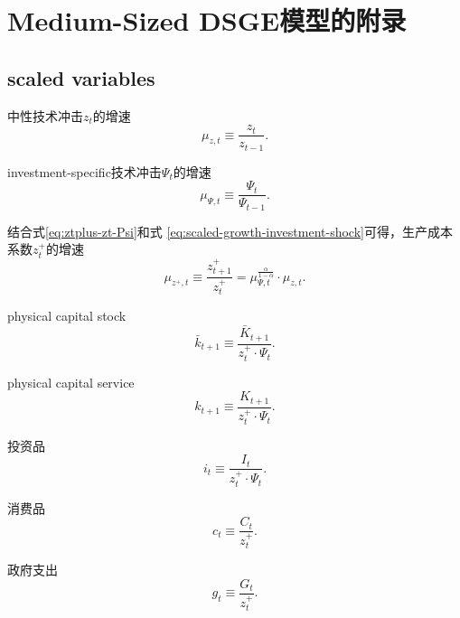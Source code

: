 \chapter{Medium-Sized DSGE模型的附录}
\section{scaled variables}
\label{scaled-variables}
中性技术冲击$z_t$的增速
\begin{equation}
  \label{eq:scaled-growth-neutral-shock}
  \mu_{z,t} \equiv \frac{z_t}{z_{t-1}}.
\end{equation}

investment-specific技术冲击$\Psi_t$的增速
\begin{equation}
  \label{eq:scaled-growth-investment-shock}
  \mu_{\Psi,t} \equiv \frac{\Psi_t}{\Psi_{t-1}}.
\end{equation}

结合式\eqref{eq:ztplus-zt-Psi}和式  \eqref{eq:scaled-growth-investment-shock}可得，生产成本系数$z_t^+$的增速
\begin{equation}
  \label{eq:scaled-growth-fixed-cost-shock}
  \mu_{z^+,t} \equiv \frac{z^+_{t+1}}{z^+_{t}} = \mu_{\Psi,t}^{\frac{\alpha}{1-\alpha}} \cdot \mu_{z,t}.
\end{equation}

physical capital stock
\begin{equation}
  \label{eq:scaled-physical-capital}
  \bar{k}_{t+1} \equiv \frac{\bar{K}_{t+1}}{z_t^{+} \cdot \Psi_{t}}.
\end{equation}

physical capital service
\begin{equation}
  \label{eq:scaled-physical-capital-service}
  k_{t+1} \equiv \frac{K_{t+1}}{z_{t}^+ \cdot \Psi_{t}}.
\end{equation}

投资品
\begin{equation}
  \label{eq:scaled-investment-goods}
  i_t \equiv \frac{I_t}{z_t^+ \cdot \Psi_{t}}.
\end{equation}

消费品
\begin{equation}
  \label{eq:scaled-consumption-goods}
  c_t \equiv \frac{C_t}{z_t^+}.
\end{equation}

政府支出
\begin{equation}
  \label{eq:scaled-government-consumption}
  g_t \equiv \frac{G_t}{z_t^+}.
\end{equation}

